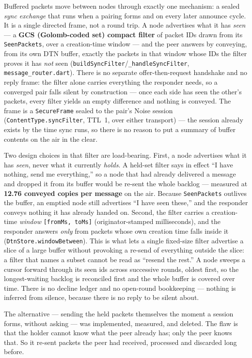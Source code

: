\documentclass[11pt]{report}
\newcommand{\code}[1]{\texttt{\small #1}}
\begin{document}
Buffered packets move between nodes through exactly one mechanism: a sealed \emph{sync exchange} that runs when a pairing forms and on every later announce cycle. It is a single directed frame, not a round trip. A node advertises what it has \emph{seen} --- a \textbf{GCS (Golomb-coded set) compact filter} of packet IDs drawn from its \code{SeenPackets}, over a creation-time window --- and the peer answers by conveying, from its own DTN buffer, exactly the packets in that window whose IDs the filter proves it has \emph{not} seen (\code{buildSyncFilter}/\code{\_handleSyncFilter}, \code{message\_router.dart}). There is no separate offer-then-request handshake and no reply frame: the filter alone carries everything the responder needs, so a converged pair falls silent by construction --- once each side has seen the other's packets, every filter yields an empty difference and nothing is conveyed. The frame is a \code{SecureFrame} sealed to the pair's Noise session (\code{ContentType.syncFilter}, TTL~1, over either transport) --- the session already exists by the time sync runs, so there is no reason to put a summary of buffer contents on the air in the clear.

Two design choices in that filter are load-bearing. First, a node advertises what it has \emph{seen}, never what it currently \emph{holds}. A held-set filter says in effect ``I have nothing, send me everything,'' so a node that had already delivered a message and dropped it from its buffer would be re-sent the whole backlog --- measured at \textbf{12.76 conveyed copies per message} on the air. Because \code{SeenPackets} outlives the buffer, an emptied node still advertises ``I have seen these,'' and the responder conveys nothing it has already handed on. Second, the filter carries a creation-time \emph{window} \code{[fromMs, toMs]} (originator-stamped milliseconds), and the responder answers \emph{only} from packets whose own creation time falls inside it (\code{DtnStore.windowBetween}). This is what lets a single fixed-size filter advertise a slice of a large buffer without provoking a re-send of everything outside the slice: a filter that names a subset cannot be read as ``resend the rest.'' A node sweeps a cursor forward through its seen ids across successive rounds, oldest first, so the longest-waiting backlog is reconciled first and the whole buffer is covered over time. There is no decline ledger and no open-round bookkeeping --- nothing is inferred from silence, because there is no reply to be silent about.

The alternative --- sending the held packets themselves the moment a session forms, without asking --- was implemented, measured, and deleted. The flaw is that the holder cannot know what the peer already has; only the peer knows that. So it re-sent packets the peer had received, processed and discarded long before.
\end{document}
